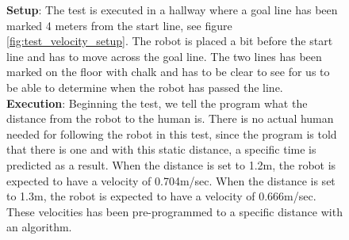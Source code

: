\begin{figure}[H]
    \centering
    \begin{minipage}[b]{0.57\linewidth}
        \textbf{Setup}: The test is executed in a hallway where a goal line has been marked 4 meters from the start line, see figure \ref{fig:test_velocity_setup}.
        The robot is placed a bit before the start line and has to move across the goal line. The two lines has been marked on the floor with chalk and has to be clear to see for us to be able to determine when the robot has passed the line.\\
        
        \textbf{Execution}: Beginning the test, we tell the program what the distance from the robot to the human is. There is no actual human needed for following the robot in this test, since the program is told that there is one and with this static distance, a specific time is predicted as a result. When the distance is set to 1.2m, the robot is expected to have a velocity of 0.704m/sec. When the distance is set to 1.3m, the robot is expected to have a velocity of 0.666m/sec. These velocities has been pre-programmed to a specific distance with an algorithm. %
        

\end{minipage}
\end{figure}

